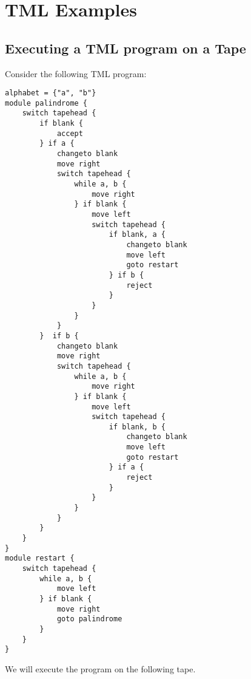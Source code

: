 
\chapter{TML Examples}
\section{Executing a TML program on a Tape}
Consider the following TML program:
\begin{lstlisting}[language=TML]
alphabet = {"a", "b"}
module palindrome {
    switch tapehead {
        if blank {
            accept
        } if a {
            changeto blank
            move right
            switch tapehead {
                while a, b {
                    move right
                } if blank {
                    move left
                    switch tapehead {
                        if blank, a {
                            changeto blank
                            move left
                            goto restart
                        } if b {
                            reject
                        }
                    }
                }
            }
        }  if b {
            changeto blank
            move right
            switch tapehead {
                while a, b {
                    move right
                } if blank {
                    move left
                    switch tapehead {
                        if blank, b {
                            changeto blank
                            move left
                            goto restart
                        } if a {
                            reject
                        }
                    }
                }
            }
        }
    }
}
module restart {
    switch tapehead {
        while a, b {
            move left
        } if blank {
            move right
            goto palindrome
        }
    }
}
\end{lstlisting}
We will execute the program on the following tape.
\begin{figure}[H]
    \centering
\end{figure}
